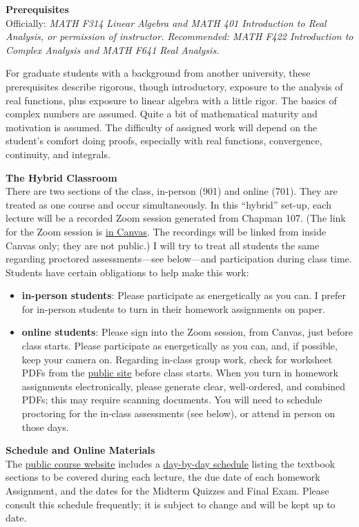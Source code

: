 \documentclass[12pt]{article}
\renewcommand{\emph}[1]{\textsf{\textbf{#1}}}
\newcommand{\localhead}[1]{\par\smallskip\textbf{#1} \smallskip\nobreak\\}%
\def\heading#1{\localhead{\large\emph{#1}}}
\begin{document}
\clearpage\newpage
\phantom{foo}
\heading{Prerequisites}
Officially: \textsl{MATH F314 Linear Algebra and MATH 401 Introduction to Real Analysis, or permission of instructor. Recommended: MATH F422 Introduction to Complex Analysis and MATH F641 Real Analysis.}

For graduate students with a background from another university, these prerequisites describe rigorous, though introductory, exposure to the analysis of real functions, plus exposure to linear algebra with a little rigor.  The basics of complex numbers are assumed.  Quite a bit of mathematical maturity and motivation is assumed.  The difficulty of assigned work will depend on the student's comfort doing proofs, especially with real functions, convergence, continuity, and integrals.


\heading{The Hybrid Classroom}
There are two sections of the class, in-person (901) and online (701).  They are treated as one course and occur simultaneously.  In this ``hybrid'' set-up, each lecture will be a recorded Zoom session generated from Chapman 107.  (The link for the Zoom session is \href{https://canvas.alaska.edu/courses/XX}{in Canvas}.  The recordings will be linked from inside Canvas only; they are not public.)  I will try to treat all students the same regarding proctored assessments---see below---and participation during class time.  Students have certain obligations to help make this work:
\begin{itemize}
\item \textbf{in-person students}: Please participate as energetically as you can.  I prefer for in-person students to turn in their homework assignments on paper.
\item \textbf{online students}:  Please sign into the Zoom session, from Canvas, just before class starts.  Please participate as energetically as you can, and, if possible, keep your camera on.  Regarding in-class group work, check for worksheet PDFs from the \href{https://bueler.github.io/fa/}{public site} before class starts.  When you turn in homework assignments electronically, please generate clear, well-ordered, and combined PDFs; this may require scanning documents.  You will need to schedule proctoring for the in-class assessments (see below), or attend in person on those days.
\end{itemize}


\heading{Schedule and Online Materials}
The \href{https://bueler.github.io/fa/}{public course website} includes a \href{https://bueler.github.io/nla/assets/general/S24/schedule.pdf}{day-by-day schedule} listing the textbook sections to be covered during each lecture, the due date of each homework Assignment, and the dates for the Midterm Quizzes and Final Exam.  Please consult this schedule frequently; it is subject to change and will be kept up to date.
\end{document}
